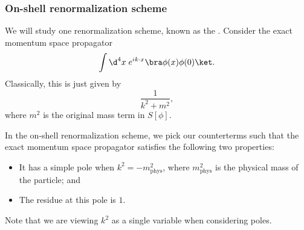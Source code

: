 \documentclass[a4paper]{article}
\begin{document}
%

\subsubsection*{On-shell renormalization scheme}
We will study one renormalization scheme, known as the . Consider the exact momentum space propagator
\[
  \int \d^4 x\; e^{ik\cdot x} \bra \phi(x) \phi(0)\ket.
\]
Classically, this is just given by
\[
  \frac{1}{k^2 + m^2},
\]
where $m^2$ is the original mass term in $S[\phi]$.

In the on-shell renormalization scheme, we pick our counterterms such that the exact momentum space propagator satisfies the following two properties:
\begin{itemize}
  \item It has a simple pole when $k^2 = - m^2_{\mathrm{phys}}$, where $m^2_{\mathrm{phys}}$ is the physical mass of the particle; and
  \item The residue at this pole is $1$.
\end{itemize}
Note that we are viewing $k^2$ as a single variable when considering poles.
\end{document}
